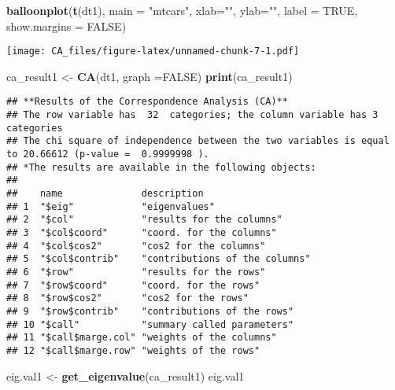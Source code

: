 \documentclass[]{article}
\newenvironment{Shaded}{\begin{snugshade}}{\end{snugshade}}
\newcommand{\KeywordTok}[1]{\textcolor[rgb]{0.13,0.29,0.53}{\textbf{#1}}}
\newcommand{\DataTypeTok}[1]{\textcolor[rgb]{0.13,0.29,0.53}{#1}}
\newcommand{\StringTok}[1]{\textcolor[rgb]{0.31,0.60,0.02}{#1}}
\newcommand{\OtherTok}[1]{\textcolor[rgb]{0.56,0.35,0.01}{#1}}
\newcommand{\NormalTok}[1]{#1}
\begin{document}
\begin{Shaded}
\begin{Highlighting}[]
\KeywordTok{balloonplot}\NormalTok{(}\KeywordTok{t}\NormalTok{(dt1), }\DataTypeTok{main =} \StringTok{"mtcars"}\NormalTok{, }\DataTypeTok{xlab=}\StringTok{""}\NormalTok{, }\DataTypeTok{ylab=}\StringTok{""}\NormalTok{,  }\DataTypeTok{label =} \OtherTok{TRUE}\NormalTok{, }\DataTypeTok{show.margins =} \OtherTok{FALSE}\NormalTok{) }
\end{Highlighting}
\end{Shaded}

\texttt{[image: CA\_files/figure-latex/unnamed-chunk-7-1.pdf]}

\begin{Shaded}
\begin{Highlighting}[]
\NormalTok{ca_result1 <-}\StringTok{ }\KeywordTok{CA}\NormalTok{(dt1, }\DataTypeTok{graph =}\OtherTok{FALSE}\NormalTok{)}
\KeywordTok{print}\NormalTok{(ca_result1)    }
\end{Highlighting}
\end{Shaded}

\begin{verbatim}
## **Results of the Correspondence Analysis (CA)**
## The row variable has  32  categories; the column variable has 3 categories
## The chi square of independence between the two variables is equal to 20.66612 (p-value =  0.9999998 ).
## *The results are available in the following objects:
## 
##    name              description                   
## 1  "$eig"            "eigenvalues"                 
## 2  "$col"            "results for the columns"     
## 3  "$col$coord"      "coord. for the columns"      
## 4  "$col$cos2"       "cos2 for the columns"        
## 5  "$col$contrib"    "contributions of the columns"
## 6  "$row"            "results for the rows"        
## 7  "$row$coord"      "coord. for the rows"         
## 8  "$row$cos2"       "cos2 for the rows"           
## 9  "$row$contrib"    "contributions of the rows"   
## 10 "$call"           "summary called parameters"   
## 11 "$call$marge.col" "weights of the columns"      
## 12 "$call$marge.row" "weights of the rows"
\end{verbatim}

\begin{Shaded}
\begin{Highlighting}[]
\NormalTok{eig.val1 <-}\StringTok{ }\KeywordTok{get_eigenvalue}\NormalTok{(ca_result1) }
\NormalTok{eig.val1 }
\end{Highlighting}
\end{Shaded}
\end{document}
